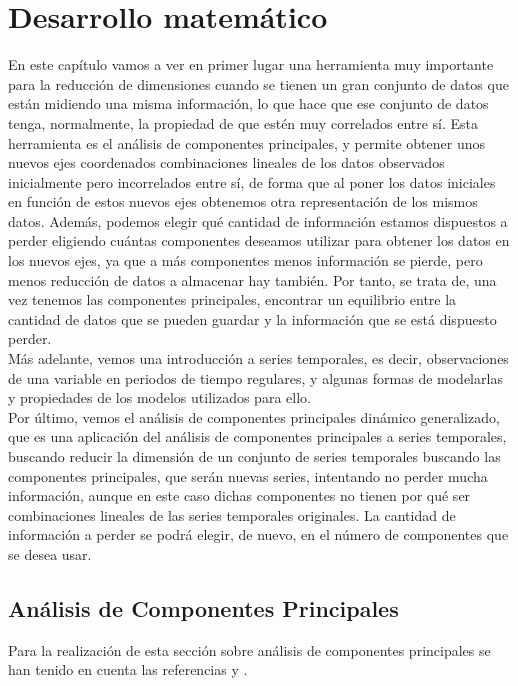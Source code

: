 %
%


\chapter{Desarrollo matemático}

En este capítulo vamos a ver en primer lugar una herramienta muy importante para la reducción de dimensiones cuando se tienen un gran conjunto de datos que están midiendo una misma información, lo que hace que ese conjunto de datos tenga, normalmente, la propiedad de que estén muy correlados entre sí. Esta herramienta es el análisis de componentes principales, y permite obtener unos nuevos ejes coordenados combinaciones lineales de los datos observados inicialmente pero incorrelados entre sí, de forma que al poner los datos iniciales en función de estos nuevos ejes obtenemos otra representación de los mismos datos. Además, podemos elegir qué cantidad de información estamos dispuestos a perder eligiendo cuántas componentes deseamos utilizar para obtener los datos en los nuevos ejes, ya que a más componentes menos información se pierde, pero menos reducción de datos a almacenar hay también. Por tanto, se trata de, una vez tenemos las componentes principales, encontrar un equilibrio entre la cantidad de datos que se pueden guardar y la información que se está dispuesto perder.\\

Más adelante, vemos una introducción a series temporales, es decir, observaciones de una variable en periodos de tiempo regulares, y algunas formas de modelarlas y propiedades de los modelos utilizados para ello.\\

Por último, vemos el análisis de componentes principales dinámico generalizado, que es una aplicación del análisis de componentes principales a series temporales, buscando reducir la dimensión de un conjunto de series temporales buscando las componentes principales, que serán nuevas series, intentando no perder mucha información, aunque en este caso dichas componentes no tienen por qué ser combinaciones lineales de las series temporales originales. La cantidad de información a perder se podrá elegir, de nuevo, en el número de componentes que se desea usar.

\section{Análisis de Componentes Principales}
Para la realización de esta sección sobre análisis de componentes principales se han tenido en cuenta las referencias \cite{anderson} y .\\

